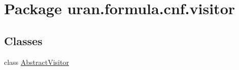 \hypertarget{namespaceuran_1_1formula_1_1cnf_1_1visitor}{}\section{Package uran.\+formula.\+cnf.\+visitor}
\label{namespaceuran_1_1formula_1_1cnf_1_1visitor}
\subsection*{Classes}
\begin{DoxyCompactItemize}
\item 
class \hyperlink{classuran_1_1formula_1_1cnf_1_1visitor_1_1_abstract_visitor}{Abstract\+Visitor}
\end{DoxyCompactItemize}

